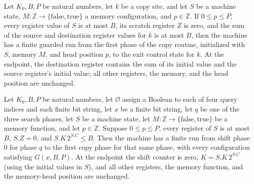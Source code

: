 \begin{theorem}
\label{Complexity.LogProg.ExpBFS.cp_run}
\leanok
{}
Let $K_0,B,P$ be natural numbers, let $k$ be a copy site, and let $S$ be a machine
state, $M\colon\mathbb{Z}\to\{\mathrm{false},\mathrm{true}\}$ a memory configuration,
and $p\in\mathbb{Z}$. If $0\le p\le P$, every register value of $S$ is at most $B$, its
scratch register $Z$ is zero, and the sum of the source and destination register values
for $k$ is at most $B$, then the machine has a finite guarded run from the first phase
of the copy routine, initialized with $S$, memory $M$, and head position $p$, to the
exit control state for $k$. At the endpoint, the destination register contains the sum
of its initial value and the source register's initial value; all other registers, the
memory, and the head position are unchanged.
\end{theorem}

\begin{theorem}
\label{Complexity.LogProg.ExpBFS.sh_run}
\leanok
{}
Let $K_0,B,P$ be natural numbers, let $\mathcal O$ assign a Boolean to each of four
query indices and each finite bit string, let $x$ be a finite bit string, let $q$ be one
of the three search phases, let $S$ be a machine state, let $M:\mathbb
Z\to\{\mathrm{false},\mathrm{true}\}$ be a memory function, and let $p\in\mathbb Z$.
Suppose $0\le p\le P$, every register of $S$ is at most $B$, $S.Z=0$, and
$S.K\,2^{S.C}\le B$. Then the machine has a finite run from shift phase $0$ for phase
$q$ to the first copy phase for that same phase, with every configuration satisfying
$G(x,B,P)$. At the endpoint the shift counter is zero, $K=S.K\,2^{S.C}$ (using the
initial values in $S$), and all other registers, the memory function, and the
memory-head position are unchanged.
\end{theorem}

